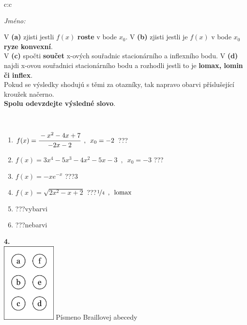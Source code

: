\documentclass[10pt]{report}
\begin{document}
\begin{tabular}{c:c}
\begin{minipage}[c][104.5mm][t]{0.5\linewidth}
\begin{center}
\textit{Jméno:}\phantom{xxxxxxxxxxxxxxxxxxxxxxxxxxxxxxxxxxxxxxxxxxxxxxxxxxxxxxxxxxxxxxxxx}\\[5mm]
\begin{minipage}{0.95\linewidth}
\begin{center}
{\small V \textbf{(a)} zjisti jestli $f(x)$ \textbf{roste} v bode $x_0$. V \textbf{(b)} zjisti jestli je $f(x)$ v bode $x_0$ \textbf{ryze konvexní}.\\V \textbf{(c)} spočti \textbf{součet} x-ových souřadnic stacionárního a inflexního bodu. V \textbf{(d)} najdi x-ovou souřadnici stacionárního bodu a rozhodli jestli to je \textbf{lomax, lomin či inflex}.\\Pokud se výsledky shodujú s těmi za otazníky, tak napravo obarvi příslušející kroužek načerno.\\\textbf{Spolu odevzdejte výsledné slovo}}.
\end{center}
\end{minipage}
\\[1mm]
\begin{minipage}{0.79\linewidth}
\begin{center}
\begin{varwidth}{\linewidth}
\begin{enumerate}
\normalsize
\item $f(x)=\cfrac{-x^2-4x+7}{-2x-2}\enspace , \enspace x_0=-2$\quad \dotfill\; ???\;\dotfill \quad {}
\item $f(x)=3x^4-5x^3-4x^2-5x-3\enspace , \enspace x_0=-3$\quad \dotfill\; ???\;\dotfill \quad {}
\item $f(x)=-xe^{-x}$\quad \dotfill\; ???\;\dotfill \quad $3$
\item $f(x)=\sqrt{2x^2-x+2}$\quad \dotfill\; ???\;\dotfill \quad $\nicefrac{1}{4}\enspace , \enspace\mathrm{lomax}$
\item \quad \dotfill\; ???\;\dotfill \quad vybarvi
\item \quad \dotfill\; ???\;\dotfill \quad nebarvi
\end{enumerate}
\end{varwidth}
\end{center}
\end{minipage}
\begin{minipage}{0.20\linewidth}
\begin{center}
{\Huge\bfseries 4.} \\[2mm]
\includegraphics[height=40mm]{../images/braille.png}
{\small Písmeno Braillovej abecedy}
\end{center}
\end{minipage}
\end{center}
\end{minipage}
%
\end{tabular}
\end{document}
